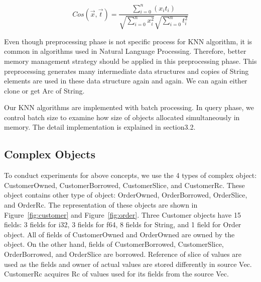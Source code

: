 \begin{equation} \label{eq:cosine}
    Cos(\vec{x}, \vec{t})
     = \frac{\sum_{i=0}^{n} (x_i t_i)}{\sqrt{\sum_{i=0}^{n} x_i^2}\sqrt{\sum_{i=0}^{n} t_i^2}}
\end{equation}

Even though preprocessing phase is not specific process for KNN algorithm, 
it is common in algorithms used in Natural Language Processing. Therefore, better memory management strategy should be applied in this preprocessing phase.
This preprocessing generates many intermediate data structures and copies of String elements are used in these data structure again and again. 
We can again either clone or get Arc of String. 

Our KNN algorithms are implemented with batch processing. In query phase, we control batch size to examine how size of objects allocated simultaneously in memory.
The detail implementation is explained in section3.2.

\subsection{Complex Objects}
\label{sec:history}
To conduct experiments for above concepts, we use the 4 types of complex object: CustomerOwned, CustomerBorrowed, CustomerSlice, and CustomerRc. 
These object contains other type of object: OrderOwned, OrderBorrowed, OrderSlice, and OrderRc.
The representation of these objects are shown in Figure~\ref{fig:customer} and Figure~\ref{fig:order}. 
Three Customer objects have 15 fields: 3 fields for i32, 3 fields for f64, 8 fields for String, and 1 field for Order object.
All of fields of CustomerOwned and OrderOwned are owned by the object. On the other hand, fields of CustomerBorrowed, CustomerSlice, OrderBorrowed, and OrderSlice are borrowed. 
Reference of slice of values are used as the fields and owner of actual values are stored differently in source Vec. 
CustomerRc acquires Rc of values used for its fields from the source Vec.

